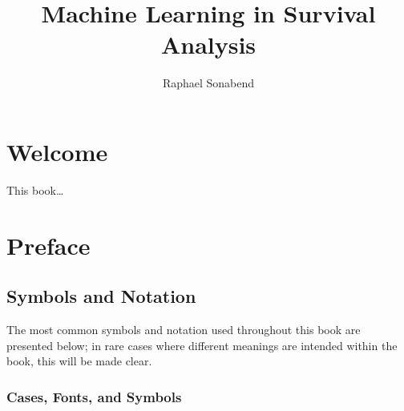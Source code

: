 \documentclass[
  letterpaper,
]{scrbook}
\title{Machine Learning in Survival Analysis}
\author{Raphael Sonabend}
\date{}
\renewcommand*\contentsname{Table of contents}
\newcommand\contentsname{Table of contents}
\theoremstyle{plain}
\theoremstyle{definition}
\theoremstyle{remark}
\begin{document}
\frontmatter
\maketitle
\ifdefined\Shaded\renewenvironment{Shaded}{\begin{tcolorbox}[enhanced, frame hidden, colback={shadecolor}, boxrule=0pt, breakable]}{\end{tcolorbox}}\fi

\renewcommand*\contentsname{Table of contents}
{
\setcounter{tocdepth}{2}
\tableofcontents
}
\listoffigures
\listoftables
\mainmatter
{}

\hypertarget{welcome}{%
\chapter*{Welcome}\label{welcome}}


This book\ldots{}


\hypertarget{preface}{%
\chapter*{Preface}\label{preface}}


\hypertarget{symbols-and-notation}{%
\section*{Symbols and Notation}\label{symbols-and-notation}}


The most common symbols and notation used throughout this book are
presented below; in rare cases where different meanings are intended
within the book, this will be made clear.

\hypertarget{cases-fonts-and-symbols}{%
\subsection*{Cases, Fonts, and Symbols}\label{cases-fonts-and-symbols}}
\end{document}
